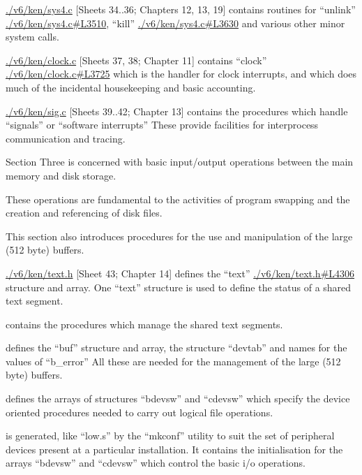 \item[sys4.c] \url{./v6/ken/sys4.c} [Sheets 34..36; Chapters 12,
13, 19] contains routines for
``unlink'' \url{./v6/ken/sys4.c#L3510}, ``kill'' \url{./v6/ken/sys4.c#L3630} and various other
minor system calls.

\item[clock.c] \url{./v6/ken/clock.c} [Sheets 37, 38; Chapter 11]
contains ``clock'' \url{./v6/ken/clock.c#L3725} which is the
handler for clock interrupts, and
which does much of the incidental
housekeeping and basic accounting.

\item[sig.c] \url{./v6/ken/sig.c} [Sheets 39..42; Chapter 13]
contains the procedures which handle
``signals'' or ``software interrupts''
These provide facilities for interprocess 
communication and tracing.
\ed


Section Three is concerned with basic
input/output operations between the
main memory and disk storage.

These operations are fundamental to the
activities of program swapping and the
creation and referencing of disk files.


This section also introduces procedures
for the use and manipulation of the
large (512 byte) buffers.

\bd
\item[text.h] \url{./v6/ken/text.h} [Sheet 43; Chapter 14]
defines the ``text'' \url{./v6/ken/text.h#L4306} structure and
array. One ``text'' structure is used
to define the status of a shared
text segment.

\item[text.c] [Sheets 43, 44; Chapter 14]
contains the procedures which manage
the shared text segments.

\item[buf.h] [Sheet 45; Chapter 15] defines
the ``buf'' structure and array, the
structure ``devtab'' and names for
the values of ``b\_error'' All these
are needed for the management of the
large (512 byte) buffers.

\item[conf.h] [Sheet 46; Chapter 15]
defines the arrays of structures
``bdevsw'' and ``cdevsw'' which specify
the device oriented procedures
needed to carry out logical file
operations.

\item[conf.c] [Sheet 46; Chapter 15] is
generated, like ``low.s'' by the
``mkconf'' utility to suit the set of
peripheral devices present at a particular 
installation. It contains
the initialisation for the arrays
``bdevsw'' and ``cdevsw'' which control
the basic i/o operations.

